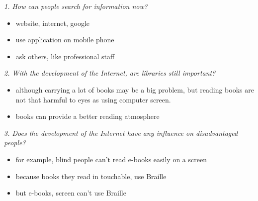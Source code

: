 \documentclass[conference]{IEEEtran}
\begin{document}
\textit{1. How can people search for information now?}
\begin{itemize}
    \item website, internet, google
    \item use application on mobile phone
    \item ask others, like professional staff
\end{itemize}

\textit{2. With the development of the Internet, are libraries still important?}
\begin{itemize}
    \item although carrying a lot of books may be a big problem, but reading books are not that harmful to eyes as using computer screen.
    \item books can provide a better reading atmosphere
\end{itemize}

\textit{3. Does the development of the Internet have any influence on disadvantaged people?}
\begin{itemize}
    \item for example, blind people can't read e-books easily on a screen
    \item because books they read in touchable, use Braille
    \item but e-books, screen can't use Braille
\end{itemize}
\end{document}
